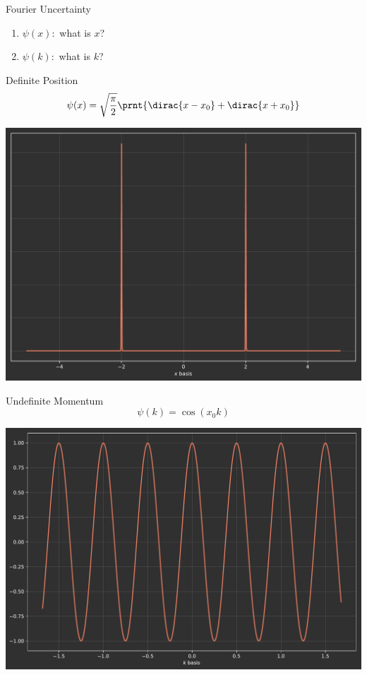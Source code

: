     \begin{frame}{Fourier Uncertainty}
        \begin{enumerate}
            \item<+-> $\psi(x):$ what is $x$?
            \item<+-> $\psi(k):$ what is $k$?
        \end{enumerate}
    \end{frame}
    
    \begin{frame}{Definite Position}
        \begin{equation*}
            \psi(x) = \sqrt{\frac{\pi}{2}}\prnt{\dirac{x-x_0} + \dirac{x+x_0}}    
        \end{equation*}
        
        \centering 
        \includegraphics[height = 0.65 \textheight]{images/Pulse3-Fourier.pdf}
    \end{frame}
    
    \begin{frame}{Undefinite Momentum}
        \begin{equation*}
            \psi(k) = \cos(x_0 k) 
        \end{equation*}
        
        \centering
        \includegraphics[height = 0.65 \textheight]{images/Pulse3.pdf}
    \end{frame}
    
